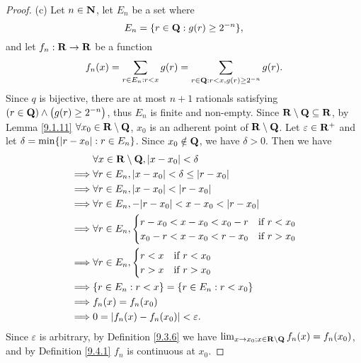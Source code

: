 \begin{proof}{(c)}
    Let \(n \in \mathbf{N}\), let \(E_n\) be a set where
    \[
        E_n = \{r \in \mathbf{Q} : g(r) \geq 2^{-n}\},
    \]
    and let \(f_n : \mathbf{R} \to \mathbf{R}\) be a function
    \[
        f_n(x) = \sum_{r \in E_n : r < x} g(r) = \sum_{r \in \mathbf{Q} : r < x, g(r) \geq 2^{-n}} g(r).
    \]
    Since \(q\) is bijective, there are at most \(n + 1\) rationals satisfying \((r \in \mathbf{Q}) \land \big(g(r) \geq 2^{-n}\big)\), thus \(E_n\) is finite and non-empty.
    Since \(\mathbf{R} \setminus \mathbf{Q} \subseteq \mathbf{R}\), by Lemma \ref{9.1.11} \(\forall x_0 \in \mathbf{R} \setminus \mathbf{Q}\), \(x_0\) is an adherent point of \(\mathbf{R} \setminus \mathbf{Q}\).
    Let \(\varepsilon \in \mathbf{R}^+\) and let \(\delta = \min\{\left\lvert r - x_0\right\rvert : r \in E_n\}\).
    Since \(x_0 \notin \mathbf{Q}\), we have \(\delta > 0\).
    Then we have
    \begin{align*}
                 & \forall x \in \R \setminus \Q, \abs{x - x_0} < \delta               \\
        \implies & \forall r \in E_n, \abs{x - x_0} < \delta \leq \abs{r - x_0}        \\
        \implies & \forall r \in E_n, \abs{x - x_0} < \abs{r - x_0}                    \\
        \implies & \forall r \in E_n, -\abs{r - x_0} < x - x_0 < \abs{r - x_0}         \\
        \implies & \forall r \in E_n, \begin{cases}
                                          r - x_0 < x - x_0 < x_0 - r & \text{if } r < x_0 \\
                                          x_0 - r < x - x_0 < r - x_0 & \text{if } r > x_0
                                      \end{cases} \\
        \implies & \forall r \in E_n, \begin{cases}
                                          r < x & \text{if } r < x_0 \\
                                          r > x & \text{if } r > x_0
                                      \end{cases}                       \\
        \implies & \{r \in E_n : r < x\} = \{r \in E_n : r < x_0\}                     \\
        \implies & f_n(x) = f_n(x_0)                                                   \\
        \implies & 0 = \abs{f_n(x) - f_n(x_0)} < \varepsilon.
    \end{align*}
    Since \(\varepsilon\) is arbitrary, by Definition \ref{9.3.6} we have \(\lim_{x \to x_0 ; x \in \mathbf{R} \setminus \mathbf{Q}} f_n(x) = f_n(x_0)\), and by Definition \ref{9.4.1} \(f_n\) is continuous at \(x_0\).


\end{proof}
